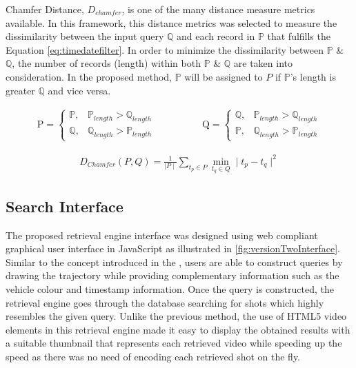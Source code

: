 Chamfer Distance, $D_{chamfer}$, is one of the many distance measure metrics available. In this framework, this distance metrics was selected to measure the dissimilarity between the input query $\mathbb{Q}$ and each record in $\mathbb{P}$ that fulfills the Equation \ref{eq:timedatefilter}. In order to minimize the dissimilarity between $\mathbb{P}$ \& $\mathbb{Q}$, the number of records (length) within both $\mathbb{P}$ \& $\mathbb{Q}$ are taken into consideration. In the proposed method, $\mathbb{P}$ will be assigned to $P$ if $\mathbb{P}$'s length is greater $\mathbb{Q}$ and vice versa.


\begin{align}
\mathrm{P} =\begin{cases}
\mathbb{P}, & \mathbb{P}_{length} > \mathbb{Q}_{length} \\
\mathbb{Q}, & \mathbb{Q}_{length} > \mathbb{P}_{length}
\end{cases}   \hspace{2em}  &  \hspace{2em}
\mathrm{Q} =\begin{cases}
\mathbb{Q}, & \mathbb{P}_{length} > \mathbb{Q}_{length} \\
\mathbb{P}, & \mathbb{Q}_{length} > \mathbb{P}_{length}
\end{cases}
\end{align}



\begin{align}
\label{eq:chamferDistance}
D_{Chamfer} (P,Q) = \frac{1}{\mid P \mid} \sum_{t_p \in P} \min_{t_q \in Q}  \mid t_p - t_q \mid^{2}
\end{align}

\subsection{Search Interface}
The proposed retrieval engine interface was designed using web compliant graphical user interface in JavaScript as illustrated in \ref{fig:versionTwoInterface}. 
Similar to the concept introduced in the \versionOneRet, users are able to construct queries by drawing the trajectory while providing complementary information such as the vehicle colour and timestamp information.
Once the query is constructed, the retrieval engine goes through the database searching for shots which highly resembles the given query. 
Unlike the previous method, the use of HTML5 video elements in this retrieval engine made it easy to display the obtained results with a suitable thumbnail that represents each retrieved video while speeding up the speed as there was no need of encoding each retrieved shot on the fly.

